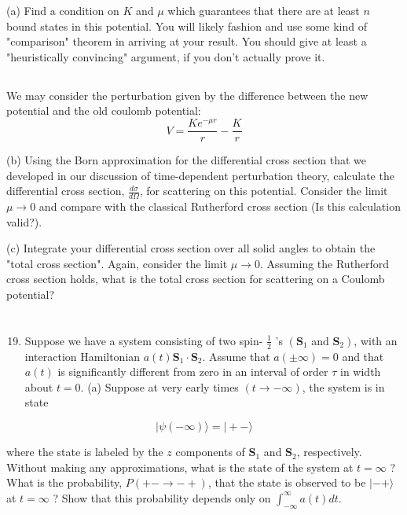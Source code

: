 \documentclass[12pt]{article}
\begin{document}
(a) Find a condition on $K$ and $\mu$ which guarantees that there are at least $n$ bound states in this potential. You will likely fashion and use some kind of "comparison" theorem in arriving at your result. You should give at least a "heuristically convincing" argument, if you don't actually prove it.
\subsection{}
We may consider the perturbation given by the difference between the new potential and the old coulomb potential:
\begin{equation}
  V= \frac{K e^{-\mu r}}{r} - \frac{K}{r}
\end{equation}

(b) Using the Born approximation for the differential cross section that we developed in our discussion of time-dependent perturbation theory, calculate the differential cross section, $\frac{d \sigma}{d \Omega}$, for scattering on this potential. Consider the limit $\mu \rightarrow 0$ and compare with the classical Rutherford cross section (Is this calculation valid?).

(c) Integrate your differential cross section over all solid angles to obtain the "total cross section". Again, consider the limit $\mu \rightarrow 0$. Assuming the Rutherford cross section holds, what is the total cross section for scattering on a Coulomb potential?
\section{}
\begin{enumerate}
  \setcounter{enumi}{18}
  \item Suppose we have a system consisting of two spin- $\frac{1}{2}$ 's $\left(\mathbf{S}_{1}\right.$ and $\left.\mathbf{S}_{2}\right)$, with an interaction Hamiltonian $a(t) \mathbf{S}_{1} \cdot \mathbf{S}_{2}$. Assume that $a( \pm \infty)=0$ and that $a(t)$ is significantly different from zero in an interval of order $\tau$ in width about $t=0$.
(a) Suppose at very early times $(t \rightarrow-\infty)$, the system is in state
\end{enumerate}

$$
|\psi(-\infty)\rangle=|+-\rangle
$$

where the state is labeled by the $z$ components of $\mathbf{S}_{1}$ and $\mathbf{S}_{2}$, respectively. Without making any approximations, what is the state of the system at $t=\infty$ ? What is the probability, $P(+-\rightarrow-+)$, that the state is observed to be $|-+\rangle$ at $t=\infty$ ? Show that this probability depends only on $\int_{-\infty}^{\infty} a(t) d t$.
\end{document}
